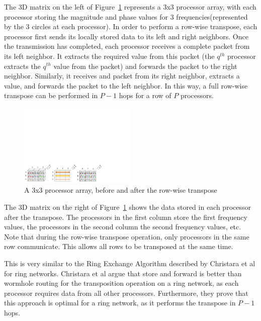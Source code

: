 \documentclass[twocolumn]{article}
\begin{document}
The 3D matrix on the left of Figure~\ref{row_wise_transpose} represents a 3x3 processor array, with each processor storing the magnitude and phase values for 3 frequencies(represented by the 3 circles at each processor). In order to perform a row-wise transpose, each processor first sends its locally stored data to its left and right neighbors. Once the transmission has completed, each processor receives a complete packet from its left neighbor. It extracts the required value from this packet (the $q^{th}$ processor extracts the $q^{th}$ value from the packet) and forwards the packet to the right neighbor. Similarly, it receives and packet from its right neighbor, extracts a value, and forwards the packet to the left neighbor. In this way, a full row-wise transpose can be performed in $P-1$ hops for a row of $P$ processors.

\begin{figure}[!h]
\centering
\includegraphics*[width=0.5\textwidth, viewport = 10 10 620 150]{figures/row_wise_transpose.pdf}
\caption{A 3x3 processor array, before and after the row-wise transpose}
\label{row_wise_transpose}
\end{figure}

The 3D matrix on the right of Figure~\ref{row_wise_transpose} shows the data stored in each processor after the transpose. The processors in the first column store the first frequency values, the processors in the second column the second frequency values, etc. Note that during the row-wise transpose operation, only processors in the same row communicate. This allows all rows to be transposed at the same time.

This is very similar to the Ring Exchange Algorithm described by Christara et al \cite{efficient-transposition} for ring networks. Christara et al argue that store and forward is better than wormhole routing for the transposition operation on a ring network, as each processor requires data from all other processors. Furthermore, they prove that this approach is optimal for a ring network, as it performs the transpose in $P-1$ hops.
\end{document}
